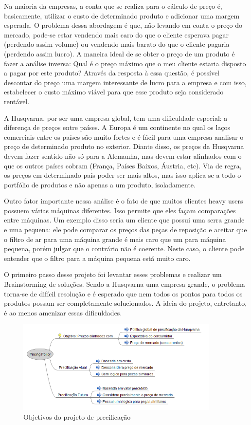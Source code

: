 \documentclass[12pt]{article}
\begin{document}
	Na maioria da empresas, a conta que se realiza para o cálculo de preço é, basicamente, utilizar o custo de determinado produto e adicionar uma margem esperada. O problema dessa abordagem é que, não levando em conta o preço do mercado, pode-se estar vendendo mais caro do que o cliente esperava pagar (perdendo assim volume) ou vendendo mais barato do que o cliente pagaria (perdendo assim lucro). A maneira ideal de se obter o preço de um produto é fazer a análise inversa: Qual é o preço máximo que o meu cliente estaria disposto a pagar por este produto? Através da resposta à essa questão, é possível descontar do preço uma margem interessante de lucro para a empresa e com isso, estabelecer o custo máximo viável para que esse produto seja considerado rentável.

	A Husqvarna, por ser uma empresa global, tem uma dificuldade especial: a diferença de preços entre países. A Europa é um continente no qual os laços comerciais entre os países são muito fortes e é fácil para uma empresa analisar o preço de determinado produto no exterior. Diante disso, os preços da Husqvarna devem fazer sentido não só para a Alemanha, mas devem estar alinhados com o que os outros países cobram (França, Países Baixos, Áustria, etc). Via de regra, os preços em determinado país poder ser mais altos, mas isso aplica-se a todo o portfólio de produtos e não apenas a um produto, isoladamente.

	Outro fator importante nessa análise é o fato de que muitos clientes heavy users possuem várias máquinas diferentes. Isso permite que eles façam comparações entre máquinas. Um exemplo disso seria um cliente que possui uma serra grande e uma pequena: ele pode comparar os preços das peças de reposição e aceitar que o filtro de ar para uma máquina grande é mais caro que um para máquina pequena, porém julgar que o contrário não é coerente. Neste caso, o cliente pode entender que o filtro para a máquina pequena está muito caro.

	O primeiro passo desse projeto foi levantar esses problemas e realizar um Brainstorming de soluções. Sendo a Husqvarna uma empresa grande, o problema torna-se de difícil resolução e é esperado que nem todos os pontos para todos os produtos possam ser completamente solucionados. A ideia do projeto, entretanto, é ao menos amenizar essas dificuldades.

\begin{figure}[h!]
	\centering
	\includegraphics[width=0.9\textwidth]{img/pricing.png}
	\caption{Objetivos do projeto de precificação}
	\label{fig:pricing}
\end{figure}
\end{document}
